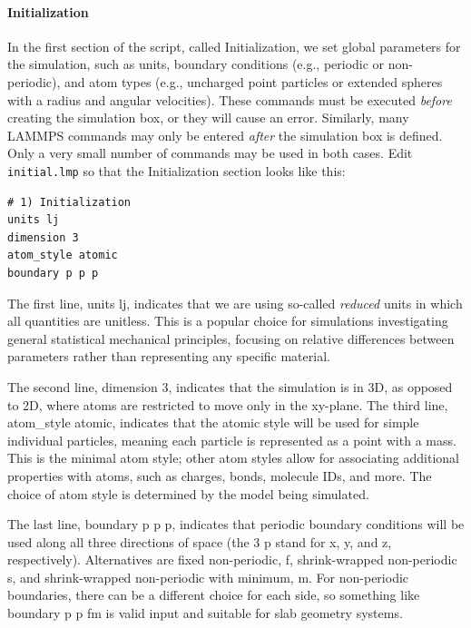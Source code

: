 \documentclass[9pt,tutorial]{livecoms}
\newcommand{\lmpcmd}[1]{\hspace{0pt}\colorbox{listing}{\textcolor{command}{\small{#1}}}\hspace{0pt}} %
\newcommand{\flecmd}[1]{\textcolor{command}{\texttt{#1}}} %
\begin{document}
\paragraph{Initialization}

In the first section of the script, called \lmpcmd{Initialization}, we
set global parameters for the simulation, such as units, boundary conditions
(e.g., periodic or non-periodic), and atom types (e.g., uncharged point particles
or extended spheres with a radius and angular velocities).  These commands must be
executed \emph{before} creating the simulation box, or they will cause
an error.  Similarly, many LAMMPS commands may only be
entered \emph{after} the simulation box is defined.  Only a very small
number of commands may be used in both cases.  Edit \flecmd{initial.lmp}
so that the \lmpcmd{Initialization} section looks like this:

\begin{lstlisting}
# 1) Initialization
units lj
dimension 3
atom_style atomic
boundary p p p
\end{lstlisting}

The first line, \lmpcmd{units lj}, indicates that we are using
so-called \emph{reduced} units in which all quantities are unitless.  This is
a popular choice for simulations investigating general statistical mechanical
principles, focusing on relative differences between parameters rather than
representing any specific material.

The second line, \lmpcmd{dimension 3}, indicates that the simulation is
in 3D, as opposed to 2D, where atoms are restricted to move only in the 
xy-plane.  The third line, \lmpcmd{atom\_style atomic}, indicates that
the \lmpcmd{atomic} style will be used for simple individual particles,
meaning each particle is represented as a point with a mass.  This is the
minimal atom style; other atom styles allow for associating additional properties
with atoms, such as charges, bonds, molecule IDs, and more.  The choice
of atom style is determined by the model being simulated.

The last line, \lmpcmd{boundary p p p}, indicates that periodic boundary
conditions will be used along all three directions of space (the 3
\lmpcmd{p} stand for \lmpcmd{x}, \lmpcmd{y}, and \lmpcmd{z},
respectively).  Alternatives are fixed non-periodic, \lmpcmd{f},
shrink-wrapped non-periodic \lmpcmd{s}, and shrink-wrapped non-periodic
with minimum, \lmpcmd{m}.  For non-periodic boundaries, there can be a
different choice for each side, so something like \lmpcmd{boundary p p
  fm} is valid input and suitable for slab geometry systems.
\end{document}
